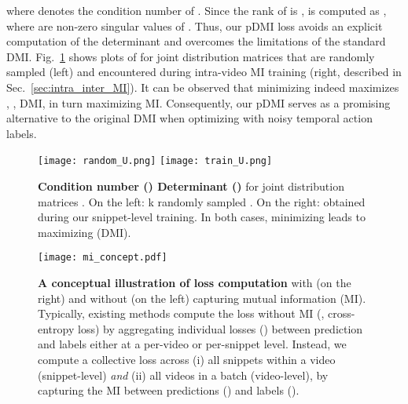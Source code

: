 \documentclass[10pt,twocolumn,letterpaper]{article}
\begin{document}
where  denotes the condition number of . Since the rank of  is ,  is computed as , where  are non-zero singular values of . Thus, our pDMI loss avoids an explicit computation of the determinant and overcomes the limitations of the standard DMI. 
Fig.~\ref{fig:eta_det} shows plots of  \vs  for joint distribution matrices  that are randomly sampled (left) and encountered during intra-video MI training (right, described in Sec.~\ref{sec:intra_inter_MI}).
It can be observed that minimizing  indeed maximizes , \ie, DMI, in turn maximizing MI.
Consequently, our pDMI serves as a promising alternative to the original DMI when optimizing with noisy temporal action labels.


\begin{figure}[t]
    \centering
    \texttt{[image: random\_U.png]}
    \texttt{[image: train\_U.png]}
    \vspace{-0.12cm}
    \caption{\textbf{Condition number () \vs Determinant ()} for joint distribution matrices . On the left: k randomly sampled . On the right:  obtained during our snippet-level training. In both cases, minimizing  leads to maximizing  (DMI).
    \vspace{-0.3cm}}
    \label{fig:eta_det}
\end{figure}

\begin{figure}[t]
    \centering
    \texttt{[image: mi\_concept.pdf]}\vspace{-0.1cm}
    \caption{\label{fig:mi_concept}\textbf{A conceptual illustration of loss computation} with (on the right) and without (on the left) capturing mutual information (MI). Typically, existing methods compute the loss without MI (\eg, cross-entropy loss) by aggregating individual losses () between prediction  and labels  either at a per-video or per-snippet level. Instead, we compute a collective loss across (i) all snippets within a video (snippet-level) \textit{and} (ii) all videos in a batch (video-level), by capturing the MI between predictions () and labels ().\vspace{-0.25cm}}
\end{figure}
\end{document}
